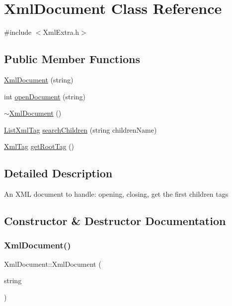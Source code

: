 \hypertarget{classXmlDocument}{}\section{Xml\+Document Class Reference}
\label{classXmlDocument}


{\ttfamily \#include $<$Xml\+Extra.\+h$>$}

\subsection*{Public Member Functions}
\begin{DoxyCompactItemize}
\item 
\hyperlink{classXmlDocument_a0e61a2b4d61602d3aa9c09e8916913e5}{Xml\+Document} (string)
\item 
int \hyperlink{classXmlDocument_ae8f7f34abeaac2ba755a71b9d12ff7b6}{open\+Document} (string)
\item 
\hyperlink{classXmlDocument_ab18742228f580a5e4ec87e4b39c8a68c}{$\sim$\+Xml\+Document} ()
\item 
\hyperlink{XmlExtra_8h_ade6a1aa0dc76b2c26a120f5c2f10ff7d}{List\+Xml\+Tag} \hyperlink{classXmlDocument_a79bce84756484b2026ee7fd15ba61b08}{search\+Children} (string children\+Name)
\item 
\hyperlink{classXmlTag}{Xml\+Tag} \hyperlink{classXmlDocument_a9c8b12f61097276eb79e31672fd30efe}{get\+Root\+Tag} ()
\end{DoxyCompactItemize}


\subsection{Detailed Description}
An X\+ML document to handle\+: opening, closing, get the first children tags 

\subsection{Constructor \& Destructor Documentation}
\mbox{\label{classXmlDocument_a0e61a2b4d61602d3aa9c09e8916913e5}} 
\subsubsection{\texorpdfstring{Xml\+Document()}{XmlDocument()}}
{\footnotesize\ttfamily Xml\+Document\+::\+Xml\+Document (\begin{DoxyParamCaption}\item[{string}]{ }\end{DoxyParamCaption})}

